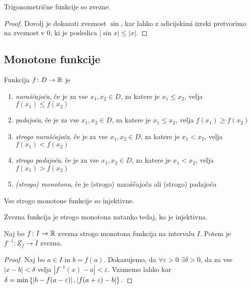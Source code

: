 \documentclass[12pt, a4paper]{article}
\begin{document}
\begin{trditev}
Trigonometrične funkcije so zvezne.
\end{trditev}

\begin{proof}
Dovolj je dokazati zveznost $\sin$, kar lahko z adicijskimi izreki pretvorimo na zveznost v $0$, ki je posledica $|\sin x|\leq |x|$.
\end{proof}

\newpage

\subsection{Monotone funkcije}

\begin{definicija}
Funkcija $f\colon D\to\mathbb{R}$ je

\begin{enumerate}[label=\arabic*)]
\item \emph{naraščajoča}, če je za vse $x_1,x_2\in D$, za katere je $x_1\leq x_2$, velja $f(x_1)\leq f(x_2)$
\item \emph{padajoča}, če je za vse $x_1,x_2\in D$, za katere je $x_1\leq x_2$, velja $f(x_1)\geq f(x_2)$
\item \emph{strogo naraščajoča}, če je za vse $x_1,x_2\in D$, za katere je $x_1<x_2$, velja $f(x_1)<f(x_2)$
\item \emph{strogo padajoča}, če je za vse $x_1,x_2\in D$, za katere je $x_1<x_2$, velja $f(x_1)>f(x_2)$
\item \emph{(strogo) monotona}, če je (strogo) naraščajoča ali (strogo) padajoča
\end{enumerate}
\end{definicija}

\begin{posledica}
Vse strogo monotone funkcije so injektivne.
\end{posledica}

\begin{posledica}
Zvezna funkcija je strogo monotona natanko tedaj, ko je injektivna.
\end{posledica}

\begin{izrek}
Naj bo $f\colon I\to\mathbb{R}$ zvezna strogo monotona funkcija na intervalu $I$. Potem je $f^{-1}:Z_f\to I$ zvezna.
\end{izrek}

\begin{proof}
Naj bo $a\in I$ in $b=f(a)$. Dokazujemo, da $\forall\varepsilon>0$ $\exists\delta>0$, da za vse $|x-b|<\delta$ velja $|f^{-1}(x)-a|<\varepsilon$. Vzamemo lahko kar $\delta=\min\left\{\left\lvert b-f(a-\varepsilon)\right\rvert,\left\lvert f(a+\varepsilon)-b\right\rvert\right\}.$
\end{proof}
\end{document}
